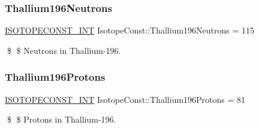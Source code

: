 \subsubsection{\texorpdfstring{Thallium196\+Neutrons}{Thallium196Neutrons}}
{\footnotesize\ttfamily \mbox{\hyperlink{group___isotope_const-_macros_ga5f18360b3e99483a35c32d789e62621c}{I\+S\+O\+T\+O\+P\+E\+C\+O\+N\+S\+T\+\_\+\+I\+NT}} Isotope\+Const\+::\+Thallium196\+Neutrons = 115}

\$ \$ Neutrons in Thallium-\/196. \mbox{\label{group___isotope_const-_thallium-_tl196_ga3b0c94fc08ad3c068f24c5ec16c80478}} 
\subsubsection{\texorpdfstring{Thallium196\+Protons}{Thallium196Protons}}
{\footnotesize\ttfamily \mbox{\hyperlink{group___isotope_const-_macros_ga5f18360b3e99483a35c32d789e62621c}{I\+S\+O\+T\+O\+P\+E\+C\+O\+N\+S\+T\+\_\+\+I\+NT}} Isotope\+Const\+::\+Thallium196\+Protons = 81}

\$ \$ Protons in Thallium-\/196. 
